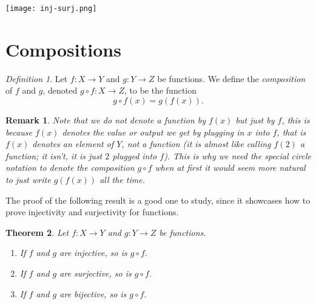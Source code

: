 \documentclass[a4paper,12pt,dvipsnames]{book}
\newtheorem{theorem}{Theorem}
\newtheorem{remark}{Remark}
\numberwithin{theorem}{chapter}
\theoremstyle{remark}
\newtheorem{definition}[theorem]{Definition}
\begin{document}
\begin{center}
\texttt{[image: inj-surj.png]}
\end{center}


\section{Compositions}

\begin{definition}
Let $f:X\rightarrow Y$ and $g:Y\rightarrow Z$ be functions. We define  the {\it composition} of $f$ and $g$, denoted $g\circ f:X\rightarrow Z$, to be the function 
\[
g\circ f(x) = g(f(x)).
\]
\end{definition}

\begin{remark}
Note that we do not denote a function by $f(x)$ but just by $f$, this is because $f(x)$ denotes the value or output we get by plugging in $x$ into $f$, that is $f(x)$ denotes an element of $Y$, not a function (it is almost like calling $f(2)$ a function; it isn't, it is just $2$ plugged into $f$). This is why we need the special circle notation to denote the composition $g\circ f$ when at first it would seem more natural to just write $g(f(x))$ all the time. 
\end{remark}


The proof of the following result is a good one to study, since it showcases how to prove injectivity and surjectivity for functions. 

\begin{theorem}
Let $f:X\rightarrow Y$ and $g:Y\rightarrow Z$ be functions. 
\begin{enumerate}
\item If $f$ and $g$ are injective, so is $g\circ f$. 
\item If $f$ and $g$ are surjective, so is $g\circ f$.
\item If $f$ and $g$ are bijective, so is $g\circ f$.
\end{enumerate}
\end{theorem}
\end{document}
